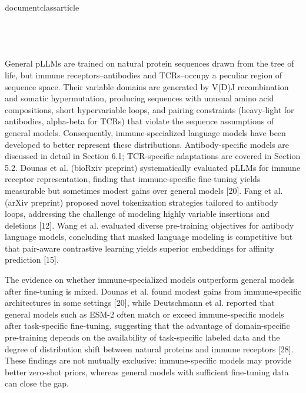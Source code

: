 \\documentclass{article}
\begin{document}
\subsection{}

General pLLMs are trained on natural protein sequences drawn from the tree of life, but immune receptors--antibodies and TCRs--occupy a peculiar region of sequence space. Their variable domains are generated by V(D)J recombination and somatic hypermutation, producing sequences with unusual amino acid compositions, short hypervariable loops, and pairing constraints (heavy-light for antibodies, alpha-beta for TCRs) that violate the sequence assumptions of general models. Consequently, immune-specialized language models have been developed to better represent these distributions. Antibody-specific models are discussed in detail in Section 6.1; TCR-specific adaptations are covered in Section 5.2. Dounas et al. (bioRxiv preprint) systematically evaluated pLLMs for immune receptor representation, finding that immune-specific fine-tuning yields measurable but sometimes modest gains over general models [20]. Fang et al. (arXiv preprint) proposed novel tokenization strategies tailored to antibody loops, addressing the challenge of modeling highly variable insertions and deletions [12]. Wang et al. evaluated diverse pre-training objectives for antibody language models, concluding that masked language modeling is competitive but that pair-aware contrastive learning yields superior embeddings for affinity prediction [15].

The evidence on whether immune-specialized models outperform general models after fine-tuning is mixed. Dounas et al. found modest gains from immune-specific architectures in some settings [20], while Deutschmann et al. reported that general models such as ESM-2 often match or exceed immune-specific models after task-specific fine-tuning, suggesting that the advantage of domain-specific pre-training depends on the availability of task-specific labeled data and the degree of distribution shift between natural proteins and immune receptors [28]. These findings are not mutually exclusive: immune-specific models may provide better zero-shot priors, whereas general models with sufficient fine-tuning data can close the gap.

\subsection{}
\end{document}

